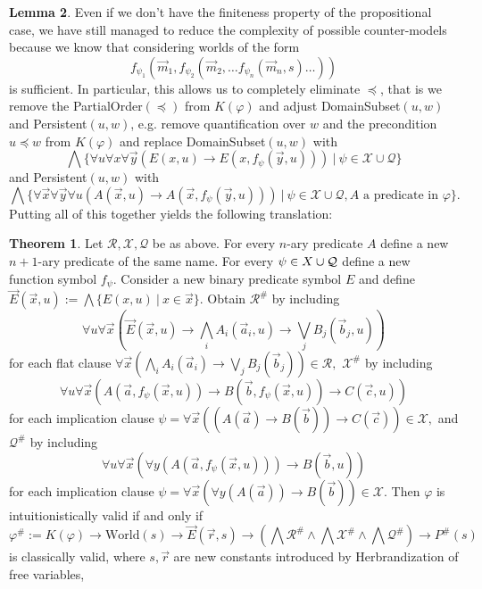 \documentclass{easychair}
\theoremstyle{definition}
\newtheorem{theorem}{Theorem}[section]
\theoremstyle{definition}
\theoremstyle{definition}
\newtheorem{lemma}[theorem]{Lemma}
\theoremstyle{definition}
\theoremstyle{definition}
\theoremstyle{definition}
\theoremstyle{definition}
\begin{document}
\begin{lemma}
Even if we don't have the finiteness property of the propositional case, we have still managed to reduce the complexity of possible counter-models because we know that considering worlds of the form $$f_{\psi_1}(\vec m_1, f_{\psi_2}(\vec m_2, \dots f_{\psi_n}(\vec m_n, s)\dots))$$ is sufficient.
In particular, this allows us to completely eliminate $\preceq$, that is we remove the PartialOrder$(\preceq)$
from $K(\varphi)$ and adjust DomainSubset$(u, w)$ and Persistent$(u, w)$, e.g. remove quantification over $w$ and the precondition $u\preceq w$ from $K(\varphi)$ and replace DomainSubset$(u, w)$ with
$$
	\bigwedge\{\forall u\forall x\forall\vec y(E(x, u)\to E(x, f_\psi(\vec y, u)))\:|\:\psi\in\mathcal X\cup\mathcal Q\}
$$
and Persistent$(u, w)$ with
$$
	\bigwedge\{\forall\vec x\forall\vec y\forall u(A(\vec x, u)\to A(\vec x, f_\psi(\vec y, u)))\:|\:\psi\in\mathcal X\cup\mathcal Q, \text{$A$ a predicate in $\varphi$}\}.
$$Putting all of this together yields the following translation:
\begin{theorem}\label{thm:fo-translation}
	Let $\mathcal R,\mathcal X,\mathcal Q$ be as above. For every $n$-ary predicate $A$ define a new $n+1$-ary predicate of the same name. For every $\psi\in\mathcal \mathcal X\cup\mathcal Q$ define a new function symbol $f_\psi$. Consider a new binary predicate symbol $E$ and define $\vec E(\vec x, u) := \bigwedge\{E(x, u)\:|\:x\in\vec x\}$. Obtain $\mathcal R^\#$ by including
	$$
		\forall u\forall \vec x\left(\vec E(\vec x, u)\to\bigwedge_i A_i(\vec a_i, u)\to\bigvee_j B_j(\vec b_j, u)\right)
	$$
 	for each flat clause
 	$
 		\forall \vec x\left(\bigwedge_i A_i(\vec a_i)\to\bigvee_j B_j(\vec b_j)\right)\in\mathcal R,
 	$
 	$\mathcal X^\#$ by including
 	$$
 		\forall u\forall \vec x\left(A(\vec a, f_\psi(\vec x, u))\to B(\vec b, f_\psi(\vec x, u))\to C(\vec c, u)\right)
 	$$
 	for each implication clause
	$
		\psi = \forall \vec x\left(\left(A(\vec a)\to B(\vec b)\right)\to C(\vec c)\right)\in\mathcal X,
	$
	and $\mathcal Q^\#$ by including
	$$
		\forall u\forall \vec x\left(\forall y\left(A(\vec a, f_\psi(\vec x, u))\right)\to B(\vec b, u)\right)
	$$
	for each implication clause
	$
		\psi = \forall \vec x\left(\forall y\left(A(\vec a)\right)\to B(\vec b)\right)\in\mathcal X.
	$
	Then $\varphi$ is intuitionistically valid if and only if
	$$
		\varphi^\# := K(\varphi)\to\text{World}(s)\to\vec E(\vec r, s) \to \left(\bigwedge\mathcal R^\#\wedge\bigwedge\mathcal X^\#\wedge\bigwedge\mathcal Q^\#\right)\to P^\#(s)
	$$
	is classically valid, where $s, \vec r$ are new constants introduced by Herbrandization of free variables,

\end{theorem}
\end{lemma}
\end{document}
